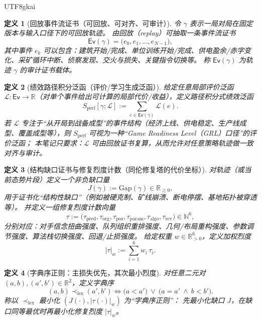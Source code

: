 \documentclass[12pt]{article}
\newtheorem{definition}{定义}[section]
\newcommand{\RR}{\mathbb{R}}
\newcommand{\NN}{\mathbb{N}}
\begin{document}
\begin{CJK*}{UTF8}{gkai}
\begin{definition}[回放事件流证书（可回放、可对齐、可审计）]
\label{def:openra-replay-event-stream}
令 $\gamma$ 表示一局对局在固定版本与输入口径下的可回放轨迹。
由回放（replay）可抽取一条事件流证书
\[
  \mathsf{Ev}(\gamma)=\bigl(e_0,e_1,\dots,e_{N-1}\bigr),
\]
其中事件 $e_k$ 可以包含：建筑开始/完成、单位训练开始/完成、供电盈余/赤字变化、采矿循环中断、侦察发现、交火与损失、关键指令切换等。
称 $\mathsf{Ev}(\gamma)$ 为轨迹 $\gamma$ 的审计证书载体。
\end{definition}

\begin{definition}[绩效路径积分泛函（评价/学习生成泛函）]
\label{def:openra-performance-action-functional}
给定任意局部评价泛函 $\mathcal{L}:\mathsf{Ev}\to\RR$（对单个事件给出可计算的局部代价/收益），定义路径积分式绩效泛函
\[
  S_{\mathrm{perf}}[\gamma;\mathcal{L}]
  :=
  \sum_{e\in \mathsf{Ev}(\gamma)} \mathcal{L}(e).
\]
若 $\mathcal{L}$ 专注于“从开局到战备成型”的事件结构（经济上线、供电稳定、生产线成型、覆盖成型等），则 $S_{\mathrm{perf}}$ 可视为一种“Game Readiness Level（GRL）口径”的评价泛函；
本笔记只要求：$\mathcal{L}$ 可由回放证书复算，从而允许对任意策略轨迹做一致对齐与审计。
\end{definition}

\begin{definition}[结构缺口证书与修复烈度计数（同伦修复塔的代价坐标）]
\label{def:openra-gap-and-tau}
对轨迹（或当前态势片段）定义一个非负缺口量
\[
  J(\gamma):=\mathrm{Gap}(\gamma)\in\RR_{\ge 0},
\]
用于证书化“结构性缺口”（例如被硬克制、矿线崩溃、断电停摆、基地拓扑被穿透等）。
并定义一组修复烈度计数向量
\[
  \tau
  :=
  \bigl(\tau_{\mathrm{pred}},\tau_{\mathrm{org}},\tau_{\mathrm{pos}},\tau_{\mathrm{param}},\tau_{\mathrm{algo}},
    \tau_{\mathrm{rev}}\bigr)\in\NN^6,
\]
分别对应：对手信念扭曲强度、队列组织重排强度、几何/布局重构强度、参数调节强度、算法栈切换强度、回退/止损强度。
给定权重 $w\in\RR_{>0}^6$，定义加权烈度
\[
  |\tau|_w := \sum_{i=1}^{6} w_i\,\tau_i.
\]
\end{definition}

\begin{definition}[字典序正则：主损失优先，其次最小烈度]
\label{def:openra-lexicographic-regularization}
对任意二元对 $(a,b),(a',b')\in\RR^2$，定义字典序
\[
  (a,b)\prec_{\mathrm{lex}}(a',b')
  \iff
  \bigl(a<a'\bigr)\ \vee\ \bigl(a=a'\ \wedge\ b<b'\bigr).
\]
称以 $\prec_{\mathrm{lex}}$ 最小化 $(J(\cdot),|\tau(\cdot)|_w)$ 为“字典序正则”：
先最小化缺口 $J$，在缺口同等最优时再最小化修复烈度 $|\tau|_w$。
\end{definition}


\end{CJK*}
\end{document}
